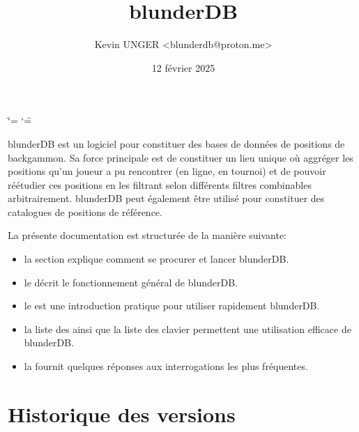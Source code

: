 \documentclass[letterpaper,10pt,french]{sphinxmanual}
\title{blunderDB}
\date{12 février 2025}
\author{Kevin UNGER \textless{}blunderdb@proton.me\textgreater{}}
\begin{document}
\ifdefined\shorthandoff
  \ifnum\catcode`\=\string=\active\shorthandoff{=}\fi
  \ifnum\catcode`\"=\active{}\fi
\fi

\pagestyle{empty}
\sphinxmaketitle
\pagestyle{plain}
\sphinxtableofcontents
\pagestyle{normal}
\label{\detokenize{index::doc}}


\sphinxAtStartPar
blunderDB est un logiciel pour constituer des bases de données de positions de
backgammon. Sa force principale est de constituer un lieu unique où aggréger
les positions qu’un joueur a pu rencontrer (en ligne, en tournoi) et de pouvoir
réétudier ces positions en les filtrant selon différents filtres combinables
arbitrairement. blunderDB peut également être utilisé pour constituer des
catalogues de positions de référence.

\sphinxAtStartPar
La présente documentation est structurée de la manière suivante:
\begin{itemize}
\item {} 
\sphinxAtStartPar
la section  explique comment se procurer et
lancer blunderDB.

\item {} 
\sphinxAtStartPar
le  décrit le fonctionnement général de blunderDB.

\item {} 
\sphinxAtStartPar
le  est une introduction pratique pour utiliser
rapidement blunderDB.

\item {} 
\sphinxAtStartPar
la liste des  ainsi que la liste des 
clavier permettent une utilisation efficace de blunderDB.

\item {} 
\sphinxAtStartPar
la  fournit quelques réponses aux interrogations les plus fréquentes.

\end{itemize}


\chapter{Historique des versions}
\label{\detokenize{index:historique-des-versions}}
\end{document}
